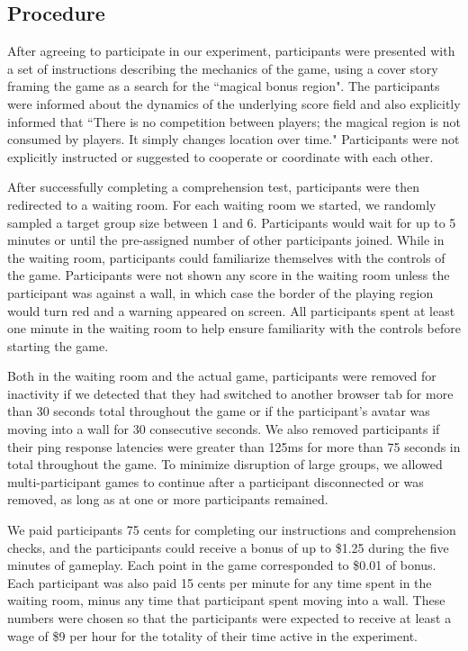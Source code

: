 \documentclass[12pt,letterpaper]{article}
\begin{document}
\subsection{Procedure}

After agreeing to participate in our experiment, participants were presented with a set of instructions describing the mechanics of the game, using a cover story framing the game as a search for the ``magical bonus region".  
The participants were informed about the dynamics of the underlying score field and also explicitly informed that ``There is no competition between players; the magical region is not consumed by players. It simply changes location over time." 
Participants were not explicitly instructed or suggested to cooperate or coordinate with each other.

After successfully completing a comprehension test, participants were then redirected to a waiting room.
For each waiting room we started, we randomly sampled a target group size between 1 and 6.
Participants would wait for up to 5 minutes or until the pre-assigned number of other participants joined.
While in the waiting room, participants could familiarize themselves with the controls of the game.  Participants were not shown any score in
the waiting room unless the participant was against a wall, in which
case the border of the playing region would turn red and a warning appeared on screen.  All participants spent at least one minute in the waiting room to help ensure familiarity with the controls before starting the game. 

Both in the waiting room and the actual game, participants were removed for inactivity if we detected that they had switched to another browser tab for more than 30 seconds total throughout the game or if the participant's avatar was moving into a wall for 30 consecutive seconds.  
We also removed participants if their ping response latencies were greater than 125ms for more than 75 seconds in total throughout the game.  
To minimize disruption of large groups, we allowed multi-participant games to continue after a participant disconnected or was removed, as long as at one or more participants remained.

We paid participants 75 cents for completing our instructions and comprehension checks, and the participants could receive a bonus of up to \$1.25 during the five minutes of gameplay. Each point in the game corresponded to \$0.01 of bonus. Each participant was also paid 15 cents per minute for any time spent in the waiting room, minus any time that participant spent moving into a wall.  These numbers were chosen so that the participants were expected to receive at least a wage of \$9 per hour for the totality of their time active in the
experiment.
\end{document}
